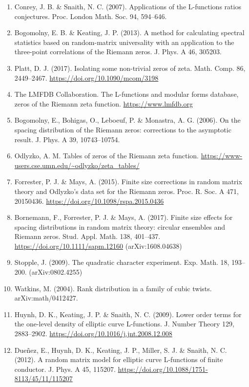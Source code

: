 \documentclass[
  10pt,
]{article}
\begin{document}
\begin{enumerate}
  Autocorrelation of ratios of L-functions. Commun. Number Theory Phys.
  2, 593--636.
\item
  Conrey, J. B. \& Snaith, N. C. (2007). Applications of the L-functions
  ratios conjectures. Proc. London Math. Soc. 94, 594--646.
\item
  Bogomolny, E. B. \& Keating, J. P. (2013). A method for calculating
  spectral statistics based on random-matrix universality with an
  application to the three-point correlations of the Riemann zeros. J.
  Phys. A 46, 305203.
\item
  Platt, D. J. (2017). Isolating some non-trivial zeros of zeta. Math.
  Comp. 86, 2449--2467. \url{https://doi.org/10.1090/mcom/3198}
\item
  The LMFDB Collaboration. The L-functions and modular forms database,
  zeros of the Riemann zeta function. \url{https://www.lmfdb.org}
\item
  Bogomolny, E., Bohigas, O., Leboeuf, P. \& Monastra, A. G. (2006). On
  the spacing distribution of the Riemann zeros: corrections to the
  asymptotic result. J. Phys. A 39, 10743--10754.
\item
  Odlyzko, A. M. Tables of zeros of the Riemann zeta function.
  \url{https://www-users.cse.umn.edu/~odlyzko/zeta_tables/}
\item
  Forrester, P. J. \& Mays, A. (2015). Finite size corrections in random
  matrix theory and Odlyzko's data set for the Riemann zeros. Proc. R.
  Soc. A 471, 20150436. \url{https://doi.org/10.1098/rspa.2015.0436}
\item
  Bornemann, F., Forrester, P. J. \& Mays, A. (2017). Finite size
  effects for spacing distributions in random matrix theory: circular
  ensembles and Riemann zeros. Stud. Appl. Math. 138, 401--437.
  \url{https://doi.org/10.1111/sapm.12160} (arXiv:1608.04638)
\item
  Stopple, J. (2009). The quadratic character experiment. Exp. Math. 18,
  193--200. (arXiv:0802.4255)
\item
  Watkins, M. (2004). Rank distribution in a family of cubic twists.
  arXiv:math/0412427.
\item
  Huynh, D. K., Keating, J. P. \& Snaith, N. C. (2009). Lower order
  terms for the one-level density of elliptic curve L-functions. J.
  Number Theory 129, 2883--2902.
  \url{https://doi.org/10.1016/j.jnt.2008.12.008}
\item
  Dueñez, E., Huynh, D. K., Keating, J. P., Miller, S. J. \& Snaith, N.
  C. (2012). A random matrix model for elliptic curve L-functions of
  finite conductor. J. Phys. A 45, 115207.
  \url{https://doi.org/10.1088/1751-8113/45/11/115207}
\end{enumerate}
\end{document}
